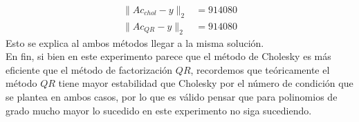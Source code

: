 \begin{homeworkProblem}
\begin{solucion}
    \begin{align*}
      \|Ac_{chol}-y\|_{2}&=914080\\
      \|Ac_{QR}-y\|_{2}&= 914080
    \end{align*}
    Esto se explica al ambos métodos llegar a la misma solución.\\
    En fin, si bien en este experimento parece que el método de Cholesky es más eficiente que el método de factorización $QR$, recordemos que teóricamente el método $QR$ tiene mayor estabilidad que Cholesky por el número de condición que se plantea en ambos casos, por lo que es válido pensar que para polinomios de grado mucho mayor lo sucedido en este experimento no siga sucediendo. 
  \end{solucion}
\end{homeworkProblem}
